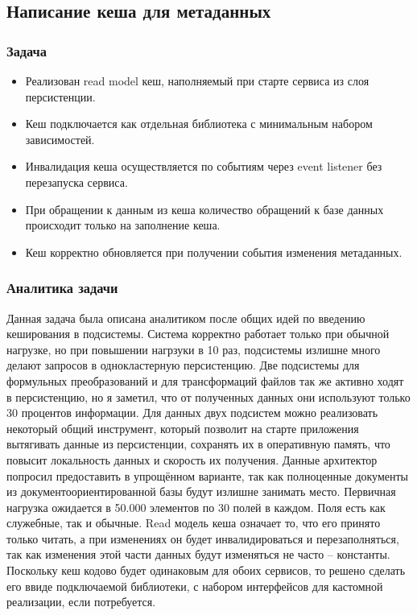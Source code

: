 \subsection{Написание кеша для метаданных}

\subsubsection{Задача}
\begin{itemize}
  \item Реализован read model кеш, наполняемый при старте сервиса из слоя персистенции.
  \item Кеш подключается как отдельная библиотека с минимальным набором зависимостей. 
  \item Инвалидация кеша осуществляется по событиям через event listener без перезапуска сервиса. 
  \item При обращении к данным из кеша количество обращений к базе данных происходит только на заполнение кеша.
  \item Кеш корректно обновляется при получении события изменения метаданных. 
\end{itemize}

\subsubsection{Аналитика задачи}

Данная задача была описана аналитиком после общих идей по введению кеширования в подсистемы. 
Система корректно работает только при обычной нагрузке, но при повышении нагрзуки в 10 раз,
подсистемы излишне много делают запросов в однокластерную персистенцию. 
Две подсистемы для формульных преобразований и для трансформаций файлов так же активно ходят в персистенцию, но я заметил,
что от полученных данных они используют только 30 процентов информации. 
Для данных двух подсистем можно реализовать некоторый общий инструмент,
который позволит на старте приложения вытягивать данные из персистенции, 
сохранять их в оперативную память, что повысит локальность данных и скорость их получения.
Данные архитектор попросил предоставить в упрощённом варианте, так как полноценные документы из документоориентированной базы будут излишне занимать место.
Первичная нагрузка ожидается в 50.000 элементов по 30 полей в каждом. Поля есть как служебные, так и обычные.
Read модель кеша означает то, что его принято только читать, 
а при изменениях он будет инвалидироваться и перезаполняться, 
так как изменения этой части данных будут изменяться не часто -- константы.
Поскольку кеш кодово будет одинаковым для обоих сервисов, то решено сделать его ввиде подключаемой библиотеки, с набором интерфейсов для кастомной реализации, если потребуется.

